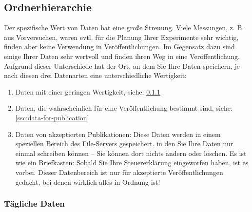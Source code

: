 \subsection{Ordnerhierarchie}

Der spezifische Wert von Daten hat eine große Streuung. Viele Messungen,
z. B. aus Vorversuchen, waren evtl. für die Planung Ihrer Experimente sehr
wichtig, finden aber keine Verwendung in Veröffentlichungen. Im Gegensatz dazu
sind einige Ihrer Daten sehr wertvoll und finden ihren Weg in eine
Veröffentlichung. Aufgrund dieser Unterschiede hat der Ort, an dem Sie Ihre
Daten speichern, je nach diesen drei Datenarten eine unterschiedliche
Wertigkeit:
\begin{enumerate}[label=\Roman*.]
  \item Daten mit einer geringen Wertigkeit, siehe:
       \ref{ssc:daily-data} 
  \item Daten, die wahrscheinlich für eine Veröffentlichung bestimmt sind,
        siehe:
        \ref{ssc:data-for-publication} 
  \item Daten von akzeptierten Publikationen: Diese Daten werden in einem
        speziellen Bereich des File-Servers gespeichert. in den Sie Ihre Daten nur
        einmal schreiben können – Sie können dort nichts ändern oder löschen.
        Es ist wie ein Briefkasten: Sobald Sie Ihre Steuererklärung eingeworfen
        haben, ist es vorbei. Dieser Datenbereich ist nur für akzeptierte
        Veröffentlichungen gedacht, bei denen wirklich alles in Ordnung ist!
\end{enumerate}

\subsubsection{Tägliche Daten}\label{ssc:daily-data}

